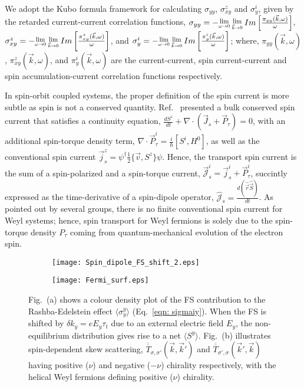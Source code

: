 \documentclass[twocolumn,epsfig,a4paper,amsmath,amssymb,showpacs,prl,superscriptaddress]{revtex4-1}
\newcommand{\Lim}[1]{\raisebox{0.5ex}{\scalebox{0.8}{$\displaystyle \lim_{#1}\;$}}}
\newcommand{\dg}{^{\dagger}}
\newcommand{\Tbar}{\overline{\overline{T}}}
\begin{document}
We adopt the Kubo formula framework for calculating $\sigma_{yy}$, $\sigma^{z}_{xy}$ and $\sigma^{i}_{y}$, given by the retarded current-current correlation functions, $\sigma_{yy} = - \Lim{\omega \rightarrow 0} \Lim{\vec{k} \rightarrow 0} Im \left[ \frac{\pi_{yy}(\vec{k}, \omega)}{\omega} \right]$, $\sigma^{z}_{xy} = -\Lim{\omega \rightarrow 0} \Lim{\vec{k} \rightarrow 0} Im \left[ \frac{\pi^{z}_{xy}(\vec{k}, \omega)}{\omega} \right]$, and $\sigma^{i}_{y} = -\Lim{\omega \rightarrow 0} \Lim{\vec{k} \rightarrow 0} Im \left[ \frac{\pi^{i}_{y}(\vec{k}, \omega)}{\omega} \right]$; where, $\pi_{yy}(\vec{k}, \omega)$, $\pi^{z}_{xy}(\vec{k}, \omega)$, and $\pi^{i}_{y}(\vec{k}, \omega)$ are the current-current, spin current-current and spin accumulation-current correlation functions respectively.

In spin-orbit coupled systems, the proper definition of the spin current is more subtle as spin is not a conserved quantity. Ref.~\cite{NiuPRL2006} presented a bulk conserved spin current that satisfies a continuity equation, $\tfrac{d S^z}{d t} + \nabla \cdot (\vec{J}_s + \vec{P}_{\tau}) = 0 $, with an additional spin-torque density term, $\nabla \cdot \vec{P}_{\tau}^i = \tfrac{i}{\hbar} [S^i, H^0]$, as well as the conventional spin current $\vec{j}^{z}_s = \psi\dg \tfrac{1}{2} \{\vec{v}, S^z\} \psi$. Hence, the transport spin current is the sum of a spin-polarized and a spin-torque current, $\vec{\mathcal{J}}^i_s = \vec{j}^i_s + \vec{P}^i_{\tau}$, succintly expressed as the time-derivative of a spin-dipole operator, $\hat{\mathcal{J}}_s = \tfrac{d (\hat{\vec{r}} \hat{\vec{S}}) }{d t}$. As pointed out by several groups\cite{MolenkampPRB2003, HalperinMischenkoPRL2004, NagaosaSugimotoPRB2006}, there is no finite conventional spin current for Weyl systems; hence, spin transport for Weyl fermions is solely due to the spin-torque density $P_{\tau}$ coming from quantum-mechanical evolution of the electron spin.  
%
\begin{figure}
\begin{center}
\begin{subfigure}{0.5 \columnwidth}
\texttt{[image: Spin\_dipole\_FS\_shift\_2.eps]}
\end{subfigure}%
\begin{subfigure}{0.45 \columnwidth}
\texttt{[image: Fermi\_surf.eps]}
\end{subfigure}
\end{center}
\captionsetup{justification=RaggedRight, singlelinecheck=false}
\caption{Fig.~(a) shows a colour density plot of the FS contribution to the Rashba-Edelstein effect $\langle \sigma^{y}_y \rangle$ (Eq.~\ref{eqn: sigmaiy}). When the FS is shifted by $\delta k_y = e E_y \tau_t$ due to an external electric field $E_{y}$, the non-equilibrium distribution gives rise to a net $\langle S^y \rangle$.  Fig.~(b) illustrates spin-dependent skew scattering, $\Tbar_{\sigma, \sigma'}(\vec{k}, \vec{k}')$ and $\Tbar_{\sigma', \sigma}(\vec{k}', \vec{k})$ having positive ($\nu$) and negative ($-\nu$) chirality respectively, with the helical Weyl fermions defining positive ($\nu$) chirality.}
\label{fig: Fermi surface}
\end{figure}
 
\end{document}
